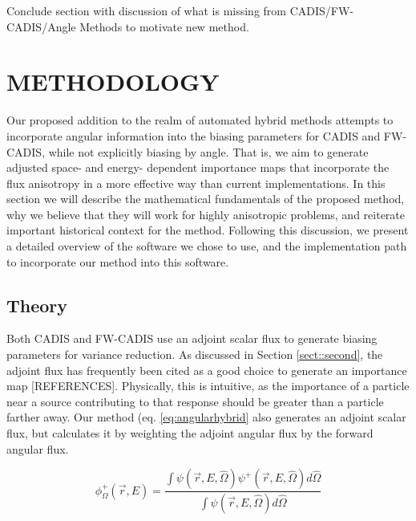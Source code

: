 \documentclass[12pt]{article}
\begin{document}
Conclude section with discussion of what is missing from CADIS/FW-CADIS/Angle Methods to motivate new method. \\

%
\section{METHODOLOGY}
\label{sect::methodology}

Our proposed addition to the realm of automated hybrid methods attempts to incorporate angular information into the biasing parameters for CADIS and FW-CADIS, while not explicitly biasing by angle. That is, we aim to generate adjusted space- and energy- dependent importance maps that incorporate the flux anisotropy in a more effective way than current implementations. In this section we will describe the mathematical fundamentals of the proposed method, why we believe that they will work for highly anisotropic problems, and reiterate important historical context for the method. Following this discussion, we present a detailed overview of the software we chose to use, and the implementation path to incorporate our method into this software.  \\

%
\subsection{Theory}
\label{subsect::theory}

Both CADIS and FW-CADIS use an adjoint scalar flux to generate biasing parameters for variance reduction. As discussed in Section \ref{sect::second}, the adjoint flux has frequently been cited as a good choice to generate an importance map [REFERENCES]. Physically, this is intuitive, as the importance of a particle near a source contributing to that response should be greater than a particle farther away. Our method (eq. \eqref{eq:angularhybrid} also generates an adjoint scalar flux, but calculates it by weighting the adjoint angular flux by the forward angular flux. 

\begin{equation} 
\phi^{+}_{\Omega}(\vec{r},E) = \frac{\int \psi(\vec {r} ,E,\hat{\Omega})\psi^+(\vec {r} ,E,\hat{\Omega})d\hat\Omega }{\int\psi(\vec {r} ,E,\hat{\Omega})d\hat\Omega}
\label{eq:angularhybrid}
\end{equation}
\end{document}
